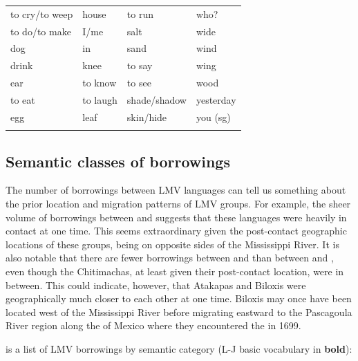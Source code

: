 \documentclass[output=paper]{LSP/langsci}
\begin{document}
\begin{table}
\begin{tabular}{llll}
 to cry/to weep          &      house                 &         to run        &      who? \\
 to do/to make           &      I/me                  &         salt          &      wide \\
 dog                     &      in                    &         sand          &      wind \\
 drink                   &      knee                  &         to say        &      wing \\
 ear                     &      to know               &         to see        &      wood \\
 to eat                  &      to laugh              &         shade/shadow  &      yesterday\\
  egg                    &     leaf                   &          skin/hide    &     you (sg) \\
       \lspbottomrule
\end{tabular}                                                                 
\end{table}

\subsection{Semantic classes of borrowings}
	
	The number of borrowings between LMV languages can tell us something about the prior location and migration patterns of LMV groups. For example, the sheer volume of borrowings between  and  suggests that these languages were heavily in contact at one time. This seems extraordinary given the post-contact geographic locations of these groups, being on opposite sides of the Mississippi River. It is also notable that there are fewer borrowings between  and  than between  and , even though the Chitimachas, at least given their post-contact location, were in between. This could indicate, however, that Atakapas and Biloxis were geographically much closer to each other at one time. Biloxis may once have been located west of the Mississippi River before migrating eastward to the Pascagoula River region along the  of Mexico where they encountered the  in 1699.

	 is a list of LMV borrowings by semantic category (L-J basic vocabulary in \textbf{bold}): 
\end{document}
